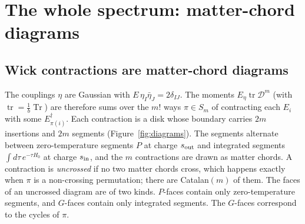 \documentclass[11pt]{article}
\newcommand{\Tr}{\operatorname{Tr}}
\newcommand{\tr}{\operatorname{tr}}
\newcommand{\Dc}{\mathcal D}
\newcommand{\sI}{s_{\rm in}}
\newcommand{\sout}{s_{\rm out}}
\theoremstyle{plain}
\theoremstyle{remark}
\numberwithin{equation}{section}
\begin{document}
\section{The whole spectrum: matter-chord diagrams}\label{sec:diagrams}

\subsection{Wick contractions are matter-chord diagrams}

The couplings $\eta$ are Gaussian with $E\,\eta_I\bar\eta_J=2\delta_{IJ}$. The moments $E_\eta\tr\Dc^m$ (with $\tr=\frac1b\Tr$)
are therefore sums over the $m!$ ways $\pi\in S_m$ of contracting each $E_i$ with some $E^\dagger_{\pi(i)}$. Each
contraction is a disk whose boundary carries $2m$ insertions and $2m$ segments (Figure~\ref{fig:diagrams}). The segments
alternate between zero-temperature segments $P$ at charge $\sout$ and integrated segments $\int d\tau\,e^{-\tau H_0}$ at
charge $\sI$, and the $m$ contractions are drawn as matter chords. A contraction is \emph{uncrossed} if no two matter
chords cross, which happens exactly when $\pi$ is a non-crossing permutation; there are Catalan$(m)$ of them. The faces
of an uncrossed diagram are of two kinds. $P$-faces contain only zero-temperature segments, and $G$-faces contain only
integrated segments. The $G$-faces correspond to the cycles of $\pi$.
\end{document}
